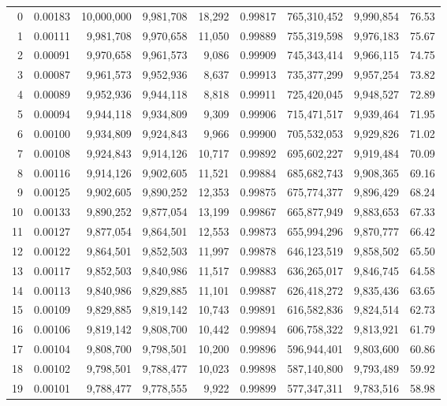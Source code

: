 \begin{longtable}{rrrrrrrrr}
0 & 0.00183 & 10,000,000 & 9,981,708 & 18,292 & 0.99817 & 765,310,452 & 9,990,854 & 76.53 \\
1 & 0.00111 & 9,981,708 & 9,970,658 & 11,050 & 0.99889 & 755,319,598 & 9,976,183 & 75.67 \\
2 & 0.00091 & 9,970,658 & 9,961,573 & 9,086 & 0.99909 & 745,343,414 & 9,966,115 & 74.75 \\
3 & 0.00087 & 9,961,573 & 9,952,936 & 8,637 & 0.99913 & 735,377,299 & 9,957,254 & 73.82 \\
4 & 0.00089 & 9,952,936 & 9,944,118 & 8,818 & 0.99911 & 725,420,045 & 9,948,527 & 72.89 \\
5 & 0.00094 & 9,944,118 & 9,934,809 & 9,309 & 0.99906 & 715,471,517 & 9,939,464 & 71.95 \\
6 & 0.00100 & 9,934,809 & 9,924,843 & 9,966 & 0.99900 & 705,532,053 & 9,929,826 & 71.02 \\
7 & 0.00108 & 9,924,843 & 9,914,126 & 10,717 & 0.99892 & 695,602,227 & 9,919,484 & 70.09 \\
8 & 0.00116 & 9,914,126 & 9,902,605 & 11,521 & 0.99884 & 685,682,743 & 9,908,365 & 69.16 \\
9 & 0.00125 & 9,902,605 & 9,890,252 & 12,353 & 0.99875 & 675,774,377 & 9,896,429 & 68.24 \\
10 & 0.00133 & 9,890,252 & 9,877,054 & 13,199 & 0.99867 & 665,877,949 & 9,883,653 & 67.33 \\
11 & 0.00127 & 9,877,054 & 9,864,501 & 12,553 & 0.99873 & 655,994,296 & 9,870,777 & 66.42 \\
12 & 0.00122 & 9,864,501 & 9,852,503 & 11,997 & 0.99878 & 646,123,519 & 9,858,502 & 65.50 \\
13 & 0.00117 & 9,852,503 & 9,840,986 & 11,517 & 0.99883 & 636,265,017 & 9,846,745 & 64.58 \\
14 & 0.00113 & 9,840,986 & 9,829,885 & 11,101 & 0.99887 & 626,418,272 & 9,835,436 & 63.65 \\
15 & 0.00109 & 9,829,885 & 9,819,142 & 10,743 & 0.99891 & 616,582,836 & 9,824,514 & 62.73 \\
16 & 0.00106 & 9,819,142 & 9,808,700 & 10,442 & 0.99894 & 606,758,322 & 9,813,921 & 61.79 \\
17 & 0.00104 & 9,808,700 & 9,798,501 & 10,200 & 0.99896 & 596,944,401 & 9,803,600 & 60.86 \\
18 & 0.00102 & 9,798,501 & 9,788,477 & 10,023 & 0.99898 & 587,140,800 & 9,793,489 & 59.92 \\
19 & 0.00101 & 9,788,477 & 9,778,555 & 9,922 & 0.99899 & 577,347,311 & 9,783,516 & 58.98 \\

\end{longtable}
